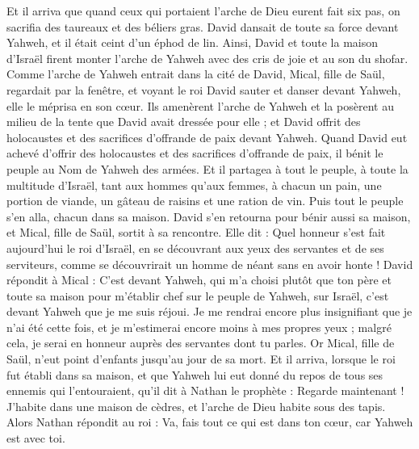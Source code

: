 \begin{multicols}{2}
Et il arriva que quand ceux qui portaient l'arche de Dieu eurent fait six pas, on sacrifia des taureaux et des béliers gras.
David dansait de toute sa force devant Yahweh, et il était ceint d'un éphod de lin.
Ainsi, David et toute la maison d'Israël firent monter l'arche de Yahweh avec des cris de joie et au son du shofar.
Comme l'arche de Yahweh entrait dans la cité de David, Mical, fille de Saül, regardait par la fenêtre, et voyant le roi David sauter et danser devant Yahweh, elle le méprisa en son cœur.
Ils amenèrent l'arche de Yahweh et la posèrent au milieu de la tente que David avait dressée pour elle ; et David offrit des holocaustes et des sacrifices d'offrande de paix devant Yahweh.
Quand David eut achevé d'offrir des holocaustes et des sacrifices d'offrande de paix, il bénit le peuple au Nom de Yahweh des armées.
Et il partagea à tout le peuple, à toute la multitude d'Israël, tant aux hommes qu'aux femmes, à chacun un pain, une portion de viande, un gâteau de raisins et une ration de vin. Puis tout le peuple s'en alla, chacun dans sa maison.
David s'en retourna pour bénir aussi sa maison, et Mical, fille de Saül, sortit à sa rencontre. Elle dit : Quel honneur s'est fait aujourd'hui le roi d'Israël, en se découvrant aux yeux des servantes et de ses serviteurs, comme se découvrirait un homme de néant sans en avoir honte !
David répondit à Mical : C'est devant Yahweh, qui m'a choisi plutôt que ton père et toute sa maison pour m'établir chef sur le peuple de Yahweh, sur Israël, c'est devant Yahweh que je me suis réjoui.
Je me rendrai encore plus insignifiant que je n'ai été cette fois, et je m'estimerai encore moins à mes propres yeux ; malgré cela, je serai en honneur auprès des servantes dont tu parles.
Or Mical, fille de Saül, n'eut point d'enfants jusqu'au jour de sa mort.
\VerseOne{}Et il arriva, lorsque le roi fut établi dans sa maison, et que Yahweh lui eut donné du repos de tous ses ennemis qui l'entouraient,
qu'il dit à Nathan le prophète : Regarde maintenant ! J'habite dans une maison de cèdres, et l'arche de Dieu habite sous des tapis.
Alors Nathan répondit au roi : Va, fais tout ce qui est dans ton cœur, car Yahweh est avec toi.

\end{multicols}
